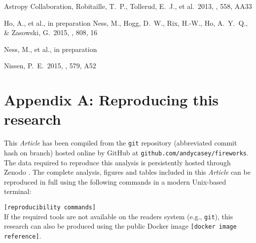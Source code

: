 \documentclass[useAMS,usenatbib]{mn2e}
\newcommand\article{\textit{Article}}
\begin{document}
\begin{thebibliography}{99}
 Astropy Collaboration, Robitaille, T.~P., Tollerud, E.~J., et al.\ 2013, \aap, 558, AA33

 Ho, A., et al., in preparation
 Ness, M., Hogg, D.~W., Rix, H.-W., Ho, A.~Y.~Q., \& Zasowski, G.\ 2015, \apj, 808, 16 

 Ness, M., et al., in preparation

 Nissen, P.~E.\ 2015, \aap, 579, A52 


\end{thebibliography}


\label{lastpage}

\section{Appendix A: Reproducing this research}
This \article{} has been compiled from the \texttt{git} repository (abbreviated commit hash \texttt{\gitAbbrevHash} on \texttt{\gitBranch} branch) hosted online by GitHub at \texttt{github.com/andycasey/fireworks}. The data required to reproduce this analysis is persistently hosted through Zenodo \citep{DATA}. The complete analysis, figures and tables included in this \article{} can be reproduced in full using the following commands in a modern Unix-based terminal:
\vspace{0.5em}

\noindent\texttt{[reproducibility commands]} 
\vspace{0.5em} \\
If the required tools are not available on the readers system (e.g., \texttt{git}), this research can also be produced using the public Docker image \texttt{[docker image reference]}.
\end{document}
